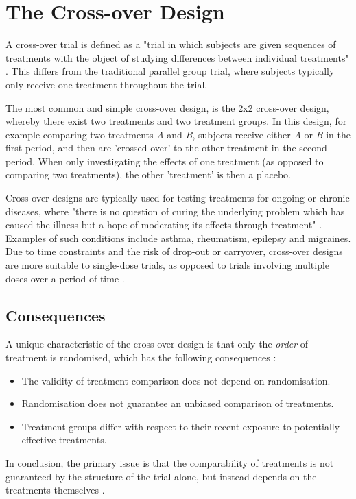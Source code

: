 \documentclass[12pt, TexShade, letterpaper]{report}
\begin{document}
\section{The Cross-over Design}
A cross-over trial is defined as a "trial in which subjects are given sequences of treatments with the object of studying differences between individual treatments" \cite{senn2002crossover}. This differs from the traditional parallel group trial, where subjects typically only receive one treatment throughout the trial.

The most common and simple cross-over design, is the 2x2 cross-over design, whereby there exist two treatments and two treatment groups. In this design, for example comparing two treatments \textit{A} and \textit{B}, subjects receive either \textit{A} or \textit{B} in the first period, and then are 'crossed over' to the other treatment in the second period. When only investigating the effects of one treatment (as opposed to comparing two treatments), the other 'treatment' is then a placebo.

Cross-over designs are typically used for testing treatments for ongoing or chronic diseases, where "there is no question of curing the underlying problem which has caused the illness but a hope of moderating its effects through treatment" \cite{senn2002crossover}. Examples of such conditions include asthma, rheumatism, epilepsy and migraines. Due to time constraints and the risk of drop-out or carryover, cross-over designs are more suitable to single-dose trials, as opposed to trials involving multiple doses over a period of time \cite{senn2002crossover}.

\subsection{Consequences}
A unique characteristic of the cross-over design is that only the \textit{order} of treatment is randomised, which has the following consequences \cite{piantadosi2005clinical}:
\begin{itemize}
    \item The validity of treatment comparison does not depend on randomisation.
    \item Randomisation does not guarantee an unbiased comparison of treatments.
    \item Treatment groups differ with respect to their recent exposure to potentially effective treatments.
\end{itemize}
In conclusion, the primary issue is that the comparability of treatments is not guaranteed by the structure of the trial alone, but instead depends on the treatments themselves \cite{piantadosi2005clinical}.
\end{document}
